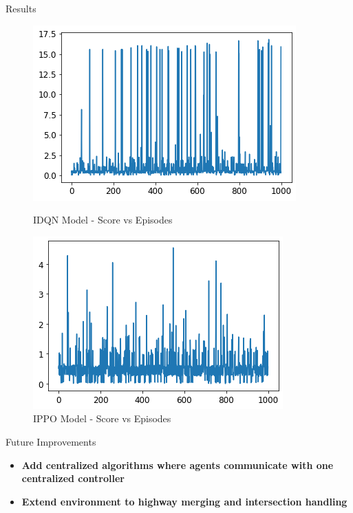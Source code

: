 \documentclass[final]{beamer}
\newlength{\onecolwid}
\begin{document}
\begin{frame}[t]
\begin{columns}[t]
\begin{column}{\onecolwid}
\begin{block}{Results}
    \begin{figure}[!tbp]
        \vspace*{0.2cm}
        \centering
        \begin{minipage}[b]{0.4\textwidth}
          \includegraphics[width=\textwidth]{images/idqn-res.png}
          \caption{IDQN Model - Score vs Episodes}
        \end{minipage}
        \hfill
        \begin{minipage}[b]{0.4\textwidth}
          \includegraphics[width=\textwidth]{images/ppo_res.png}
          \caption{IPPO Model - Score vs Episodes}
        \end{minipage}
      \end{figure}
\end{block} 

\begin{block}{Future Improvements}
    \begin{itemize}
      \item \textbf{Add centralized algorithms where agents communicate with one centralized controller}
      \item \textbf{Extend environment to highway merging and intersection handling}
    \end{itemize}
\end{block} 


\end{column}
\end{columns}
\end{frame}
\end{document}
